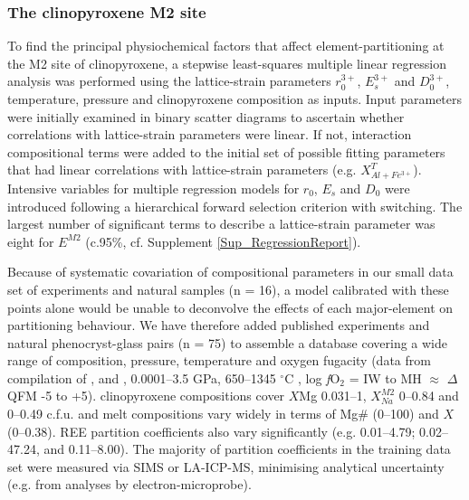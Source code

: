 \documentclass[review,authoryear,12pt]{elsarticle}
\newcommand{\dgC}{$^\circ$C }
\newcommand{\fO}{\textit{f}O$_{2}$ }
\begin{document}

	
\subsubsection{The clinopyroxene M2 site}		
	To find the principal physiochemical factors that affect element-partitioning at the M2 site of clinopyroxene, a stepwise least-squares multiple linear regression analysis was performed using the lattice-strain parameters $r_0^{3+}$, $E_s^{3+}$ and $D_0^{3+}$, temperature, pressure and clinopyroxene composition as inputs. Input parameters were initially examined in binary scatter diagrams to ascertain whether correlations with lattice-strain parameters were linear. If not, interaction compositional terms were added to the initial set of possible fitting parameters that had linear correlations with lattice-strain parameters (e.g. $X^{T}_{Al + Fe^{3+}}$). Intensive variables for multiple regression models for $r_0$, $E_s$ and $D_0$ were introduced following a hierarchical forward selection criterion with switching. The largest number of significant terms to describe a lattice-strain parameter was eight for $E^{M2}$ (c.95\%, cf. Supplement \ref{Sup_RegressionReport}).
		
	Because of systematic covariation of compositional parameters in our small data set of experiments and natural samples (n = 16), a model calibrated with these points alone would be unable to deconvolve the effects of each major-element on partitioning behaviour. We have therefore added published experiments and natural phenocryst-glass pairs (n = 75) to assemble a database covering a wide range of composition, pressure, temperature and oxygen fugacity (data from compilation of \citealt{Bedard2014}, and \citealt{Mollo2016}, 0.0001--3.5 GPa, 650--1345 \dgC, log \fO = IW to MH $\approx$ $\Delta$QFM -5 to +5). clinopyroxene compositions cover $X$Mg 0.031--1, $X_{Na}^{M2}$ 0--0.84 and  0--0.49 c.f.u. and melt compositions vary widely in terms of Mg\# (0--100) and $X$ (0--0.38).
	 REE partition coefficients also vary significantly (e.g.  0.01--4.79;  0.02--47.24, and  0.11--8.00). The majority of partition coefficients in the training data set were measured via SIMS or LA-ICP-MS, minimising analytical uncertainty (e.g. from analyses by electron-microprobe).
\end{document}
